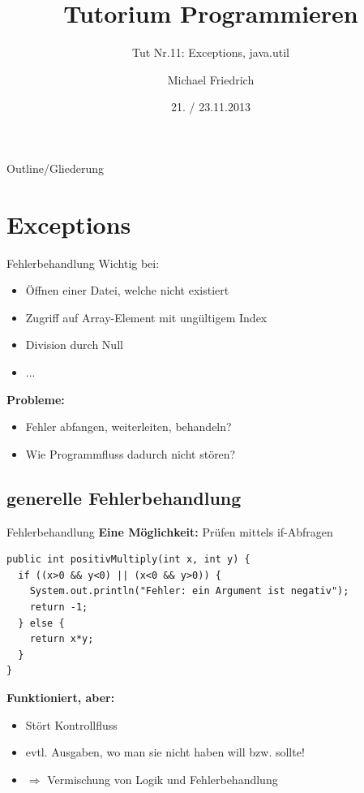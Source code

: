 \documentclass[18pt]{beamer}
\title[Prog Tut Nr. 11]{Tutorium Programmieren}
\subtitle{Tut Nr.11: Exceptions, java.util}
\author{Michael Friedrich}
\date{21. / 23.11.2013}
\institute{Institut f\"ur theoretische Informatik}
\begin{document}

\begin{frame}
	\titlepage
\end{frame}

\begin{frame}{Outline/Gliederung}
  \tableofcontents
\end{frame}

\section{Exceptions}
\begin{frame}{Fehlerbehandlung}
Wichtig bei:
\begin{itemize}
	\item Öffnen einer Datei, welche nicht existiert
  \item Zugriff auf Array-Element mit ungültigem Index
  \item Division durch Null
  \item ...
\end{itemize}
\pause
\textbf{Probleme:}
\begin{itemize}
	\item Fehler abfangen, weiterleiten, behandeln?
  \item Wie Programmfluss dadurch nicht stören?
\end{itemize}
\end{frame}

\subsection{generelle Fehlerbehandlung}
\begin{frame}[fragile]{Fehlerbehandlung}
	\textbf{Eine Möglichkeit:} Prüfen mittels if-Abfragen
  \begin{lstlisting}
public int positivMultiply(int x, int y) {
  if ((x>0 && y<0) || (x<0 && y>0)) {
    System.out.println("Fehler: ein Argument ist negativ");
    return -1;
  } else {
    return x*y;
  }
}
  \end{lstlisting}
  \pause
  \textbf{Funktioniert, aber:}
  \begin{itemize}
    \item Stört Kontrollfluss
    \item evtl. Ausgaben, wo man sie nicht haben will bzw. sollte!
    \item[] $\Rightarrow$ Vermischung von Logik und Fehlerbehandlung
  \end{itemize}
\end{frame}
\end{document}
